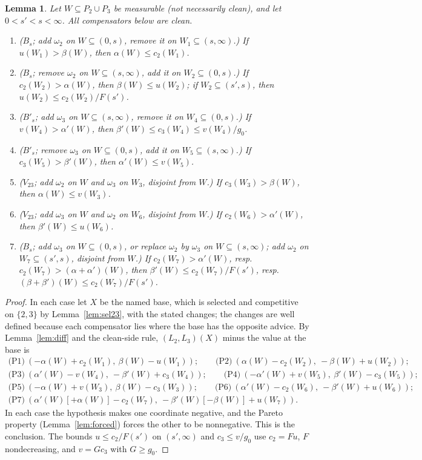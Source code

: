 \documentclass[11pt]{article}
\newtheorem{lemma}[theorem]{Lemma}
\theoremstyle{definition}\newtheorem{definition}[theorem]{Definition}
\theoremstyle{remark}\newtheorem{remark}[theorem]{Remark}
\begin{document}
\begin{lemma}\label{lem:pareto}
Let $W\subseteq P_2\cup P_3$ be measurable (not necessarily clean), and let
$0<s'<s<\infty$. All compensators below are clean.
\begin{enumerate}[label=(P\arabic*),leftmargin=*,itemsep=2pt]
\item ($B_s$; add $\omega_2$ on $W\subseteq(0,s)$, remove it on
$W_1\subseteq(s,\infty)$.) If $u(W_1)>\beta(W)$, then $\alpha(W)\le
c_2(W_1)$.
\item ($B_s$; remove $\omega_2$ on $W\subseteq(s,\infty)$, add it on
$W_2\subseteq(0,s)$.) If $c_2(W_2)>\alpha(W)$, then $\beta(W)\le u(W_2)$;
if $W_2\subseteq(s',s)$, then $u(W_2)\le c_2(W_2)/F(s')$.
\item ($B'_s$; add $\omega_3$ on $W\subseteq(s,\infty)$, remove it on
$W_4\subseteq(0,s)$.) If $v(W_4)>\alpha'(W)$, then $\beta'(W)\le c_3(W_4)\le
v(W_4)/g_0$.
\item ($B'_s$; remove $\omega_3$ on $W\subseteq(0,s)$, add it on
$W_5\subseteq(s,\infty)$.) If $c_3(W_5)>\beta'(W)$, then $\alpha'(W)\le
v(W_5)$.
\item ($V_{23}$; add $\omega_2$ on $W$ and $\omega_3$ on $W_3$, disjoint
from $W$.) If $c_3(W_3)>\beta(W)$, then $\alpha(W)\le v(W_3)$.
\item ($V_{23}$; add $\omega_3$ on $W$ and $\omega_2$ on $W_6$, disjoint
from $W$.) If $c_2(W_6)>\alpha'(W)$, then $\beta'(W)\le u(W_6)$.
\item ($B_s$; add $\omega_3$ on $W\subseteq(0,s)$, or replace $\omega_2$ by
$\omega_3$ on $W\subseteq(s,\infty)$; add $\omega_2$ on $W_7\subseteq(s',s)$,
disjoint from $W$.) If $c_2(W_7)>\alpha'(W)$, resp.\
$c_2(W_7)>(\alpha+\alpha')(W)$, then $\beta'(W)\le c_2(W_7)/F(s')$, resp.\
$(\beta+\beta')(W)\le c_2(W_7)/F(s')$.
\end{enumerate}
\end{lemma}
\begin{proof}
In each case let $X$ be the named base, which is selected and competitive on
$\{2,3\}$ by Lemma~\ref{lem:sel23}, with the stated changes; the changes are
well defined because each compensator lies where the base has the opposite
advice. By Lemma~\ref{lem:diff} and the clean-side rule, $(L_2,L_3)(X)$ minus
the value at the base is
\begin{gather*}
 \text{(P1)}\ (-\alpha(W)+c_2(W_1),\ \beta(W)-u(W_1));\qquad
 \text{(P2)}\ (\alpha(W)-c_2(W_2),\ -\beta(W)+u(W_2));\\
 \text{(P3)}\ (\alpha'(W)-v(W_4),\ -\beta'(W)+c_3(W_4));\qquad
 \text{(P4)}\ (-\alpha'(W)+v(W_5),\ \beta'(W)-c_3(W_5));\\
 \text{(P5)}\ (-\alpha(W)+v(W_3),\ \beta(W)-c_3(W_3));\qquad
 \text{(P6)}\ (\alpha'(W)-c_2(W_6),\ -\beta'(W)+u(W_6));\\
 \text{(P7)}\ (\alpha'(W)[+\alpha(W)]-c_2(W_7),\ -\beta'(W)[-\beta(W)]+u(W_7)).
\end{gather*}
In each case the hypothesis makes one coordinate negative, and the Pareto
property (Lemma~\ref{lem:forced}) forces the other to be nonnegative. This is
the conclusion. The bounds $u\le c_2/F(s')$ on $(s',\infty)$ and $c_3\le v/g_0$
use $c_2=Fu$, $F$ nondecreasing, and $v=Gc_3$ with $G\ge g_0$.
\end{proof}
\end{document}
